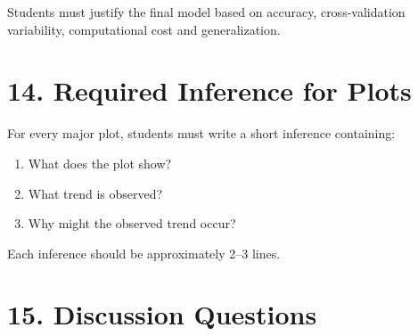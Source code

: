 \documentclass[10pt]{article}
\begin{document}
Students must justify the final model based on accuracy, cross-validation
variability, computational cost and generalization.

\section*{14. Required Inference for Plots}

For every major plot, students must write a short inference containing:

\begin{enumerate}
\item What does the plot show?
\item What trend is observed?
\item Why might the observed trend occur?
\end{enumerate}

Each inference should be approximately 2--3 lines.

\section*{15. Discussion Questions}
\end{document}
